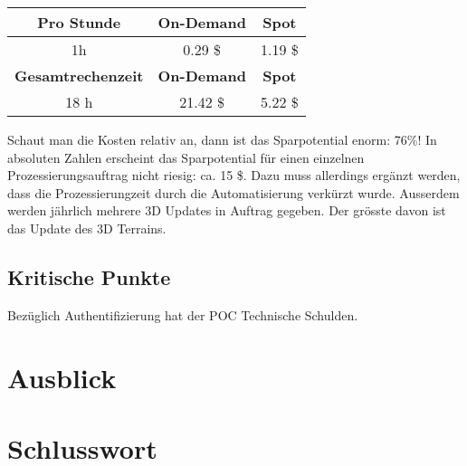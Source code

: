 \begin{center}
\begin{tabular}{| c | c | c |}
    \hline
	\textbf{Pro Stunde} & \textbf{On-Demand} & \textbf{Spot}\\
	\hline
	 1h & 0.29 \$ & 1.19 \$\\
	\hline
	\textbf{Gesamtrechenzeit} & \textbf{On-Demand} & \textbf{Spot}\\
	\hline
	 18 h & 21.42 \$ & 5.22 \$\\
	\hline
\end{tabular}
\end{center}

Schaut man die Kosten relativ an, dann ist das Sparpotential enorm: 76\%! In absoluten Zahlen erscheint das Sparpotential für einen einzelnen Prozessierungsauftrag nicht riesig: ca. 15 \$. Dazu muss allerdings ergänzt werden, dass die Prozessierungzeit durch die Automatisierung verkürzt wurde. Ausserdem werden jährlich mehrere 3D Updates in Auftrag gegeben. Der grösste davon ist das Update des 3D Terrains.

\subsection{Kritische Punkte}
Bezüglich Authentifizierung hat der POC Technische Schulden.


\section{Ausblick}

\section{Schlusswort}
